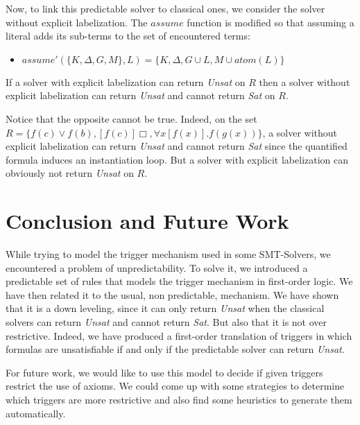 \documentclass[a4paper,11pt]{article}
\newcommand{\atom}{\mathit{atom}}
\newcommand{\A}{\mathit{assume}}
\begin{document}
Now, to link this predictable solver to classical ones,
we consider the solver without explicit labelization. The $\A$ function is modified so that
assuming a literal adds its sub-terms to the set of encountered terms:
\begin{itemize}
 \item $\A'(\{K,\Delta,G,M\},L) = \{K,\Delta,G\cup L, M\cup\atom(L)\}$
\end{itemize}

{\theorem If a solver with explicit labelization can return \emph{Unsat} on $R$ then
a solver without explicit labelization can return \emph{Unsat} and cannot return \emph{Sat} on $R$.}

Notice that the opposite cannot be true. Indeed, on the set
$R=\{f(c)\vee f(b), [f(c)]\Box, \forall x[f(x)]. f(g(x))\}$, a solver without explicit labelization
can return \emph{Unsat} and cannot return \emph{Sat} since the quantified formula induces an
instantiation loop. But a solver with explicit labelization can obviously not return \emph{Unsat} on
$R$.

\section{Conclusion and Future Work}
While trying to model the trigger mechanism used in some SMT-Solvers, we encountered a problem of
unpredictability. To solve it, we introduced a predictable set of rules that models the trigger
mechanism in first-order logic. We have then related it to the usual, non predictable, mechanism.
We have shown that it is a down leveling, since it can only return \emph{Unsat} when the
classical solvers can return \emph{Unsat} and cannot return \emph{Sat}. But also that it is not over
restrictive. Indeed, we have produced a first-order translation of triggers in which formulas are
unsatisfiable if and only if the predictable solver can return \emph{Unsat}.

For future work, we would like to use this model to decide if given triggers restrict the use of axioms.
We could come up with some strategies to determine which triggers are more restrictive and
also find some heuristics to generate them automatically.



\end{document}

